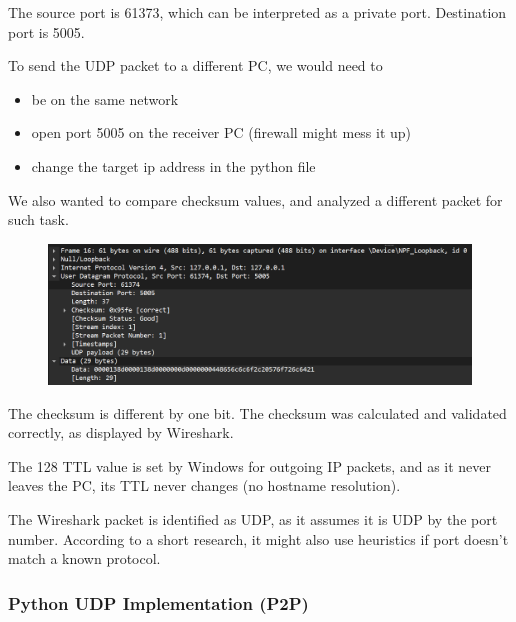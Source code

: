 The source port is 61373, which can be interpreted as a private port.
Destination port is 5005.

To send the UDP packet to a different PC, we would need to

\begin{itemize}
	\item be on the same network
	\item open port 5005 on the receiver PC (firewall might mess it up)
	\item change the target ip address in the python file
\end{itemize}

We also wanted to compare checksum values, and analyzed a different packet for
such task.

\begin{figure}[htbp]
	\centering
	\includegraphics[width=1\linewidth]{img/second_exp/4.png}
	\caption{}\label{fig:2_4}
\end{figure}

The checksum is different by one bit. The checksum was calculated and validated
correctly, as displayed by Wireshark.

The 128 TTL value is set by Windows for outgoing IP packets, and as it never
leaves the PC, its TTL never changes (no hostname resolution).

The Wireshark packet is identified as UDP, as it assumes it is UDP by the port
number. According to a short research, it might also use heuristics if port
doesn't match a known protocol.

\subsubsection{Python UDP Implementation (P2P)}
